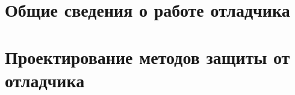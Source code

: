 


  \newpage

  \tableofcontents
  \newpage

  \chapter{Общие сведения о работе отладчика}
  
  
  
  
  
  \chapter{Проектирование методов защиты от отладчика}
  
  
  
  
  


